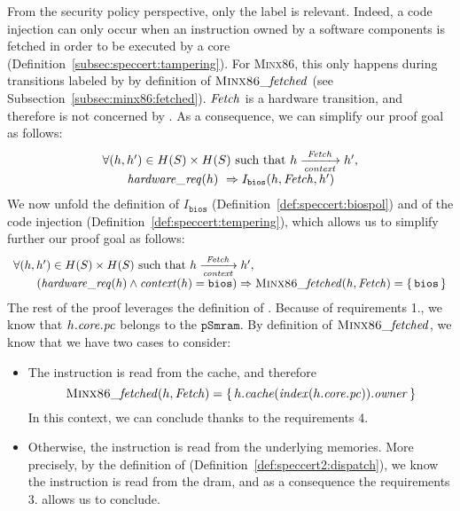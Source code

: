 From the security policy perspective, only the  label is relevant.
%
Indeed, a code injection can only occur when an instruction owned by a software
components is fetched in order to be executed by a core
(Definition~\ref{subsec:speccert:tampering}).
%
For {\scshape Minx86}, this only happens during transitions labeled by
 by definition of \( \textsc{Minx86}\mathit{\_fetched} \) (see
Subsection~\ref{subsec:minx86:fetched}).
%
\( \mathit{Fetch} \) is a hardware transition, and therefore is not concerned by
.
%
As a consequence, we can simplify our proof goal as follows:
%
\[
  \begin{array}{l}
    \forall (h, h') \in H(S) \times H(S) \text{ such that } h
    \xrightarrow[\mathit{context}]{\mathit{Fetch}} h', \\
    \qquad \mathit{hardware\_req}(h)\ \Rightarrow I_{\mathtt{bios}}(h, \mathit{Fetch}, h')
  \end{array}
\]
%
We now unfold the definition of \( I_{\mathtt{bios}} \)
(Definition~\ref{def:speccert:biospol}) and of the code injection
(Definition~\ref{def:speccert:tempering}), which allows us to simplify further
our proof goal as follows:
%
\[
  \begin{array}{l}
    \forall (h, h') \in H(S) \times H(S) \text{ such that } h
    \xrightarrow[\mathit{context}]{\mathit{Fetch}} h', \\
    \qquad (\mathit{hardware\_req}(h) \wedge \mathit{context}(h) = \mathtt{bios})
    \Rightarrow \textsc{Minx86}\mathit{\_fetched}(h, \mathit{Fetch}) =
    \{\,\mathtt{bios}\,\}
  \end{array}
\]
%
The rest of the proof leverages the definition of .
%
Because of requirements 1., we know that \( h.\mathit{core}.\mathit{pc} \) belongs
to the \( \texttt{pSmram} \).
%
By definition of \( \textsc{Minx86}\mathit{\_fetched} \), we know that we have two
cases to consider:
%
\begin{itemize}
\item The instruction is read from the cache, and therefore
  \[
    \textsc{Minx86}\mathit{\_fetched}(h, \mathit{Fetch}) =
    \{\,h.\mathit{cache}(\mathit{index}(h.\mathit{core}.\mathit{pc})).\mathit{owner}\,\}
  \]
  In this context, we can conclude thanks to the requirements 4.
\item Otherwise, the instruction is read from the underlying memories.
  More precisely, by the definition of 
  (Definition~\ref{def:speccert2:dispatch}), we know the instruction is read
  from the \ac{dram}, and as a consequence the requirements 3. allows us to
  conclude.
\end{itemize}


